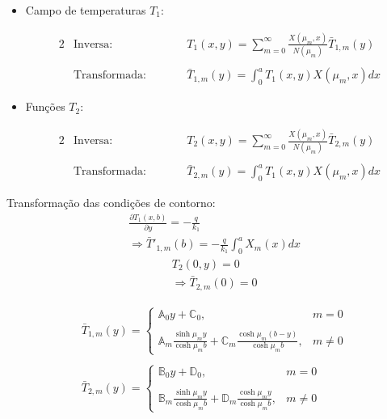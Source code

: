 \begin{itemize}
	\item Campo de temperaturas $T_1$:
	\begin{fleqn} 
		\begin{alignat}{2}
		& \text{Inversa:} && T_1(x, y) = \sum_{m=0}^\infty \frac{X(\mu_m, x)}{N(\mu_m)}\bar{T}_{1,m}(y) \label{definicao_da_transf_inv_T1} \\ \nonumber \\
		& \text{Transformada:} \quad\quad && \bar{T}_{1,m}(y) = \int_0^a T_1(x, y) X(\mu_m, x) dx \label{definicao_da_transf_T1}
		\end{alignat}
	\end{fleqn}
	\item Funções $T_2$:
	\begin{fleqn}
		\begin{alignat}{2}
		& \text{Inversa:} && T_2(x, y) = \sum_{m=0}^\infty \frac{X(\mu_m, x)}{N(\mu_m)}\bar{T}_{2,m}(y) \label{definicao_da_transf_inv_T2} \\ \nonumber \\
		& \text{Transformada:} \quad\quad && \bar{T}_{2,m}(y) = \int_0^a T_1(x, y) X(\mu_m, x) dx \label{definicao_da_transf_T2}
		\end{alignat}
	\end{fleqn}
\end{itemize}

Transformação das condições de contorno:
\begin{align}
& 	\frac{\partial T_1(x, b)}{\partial y} = -\frac{q}{k_1} \nonumber \\
&	\Rightarrow \bar{T}'_{1,m}(b) = -\frac{q}{k_1} \nonumber \int_0^a X_m(x) dx
\end{align}
\begin{align}
& T_2(0, y) = 0 \nonumber \\
& \Rightarrow \bar{T}_{2,m}(0) = 0
\end{align}

\begin{align}
& \bar{T}_{1,m}(y) = \left\lbrace
	\begin{array}{ll}
		\mathbb{A}_0 y + \mathbb{C}_0, & m = 0 \\ \\
		\displaystyle\mathbb{A}_m\frac{\sinh\mu_m y}{\cosh\mu_m b} + \mathbb{C}_m\frac{\cosh\mu_m (b - y)}{\cosh\mu_m b}, & m \ne 0
	\end{array}
\right .
 \\ \nonumber \\
& \bar{T}_{2,m}(y) = \left\lbrace
\begin{array}{ll}
\mathbb{B}_0 y + \mathbb{D}_0, & m = 0 \\ \\
\displaystyle\mathbb{B}_m\frac{\sinh\mu_m y}{\cosh\mu_m b} + \mathbb{D}_m\frac{\cosh\mu_m y}{\cosh\mu_m b} , & m \ne 0
\end{array}
\right .
\end{align} 

